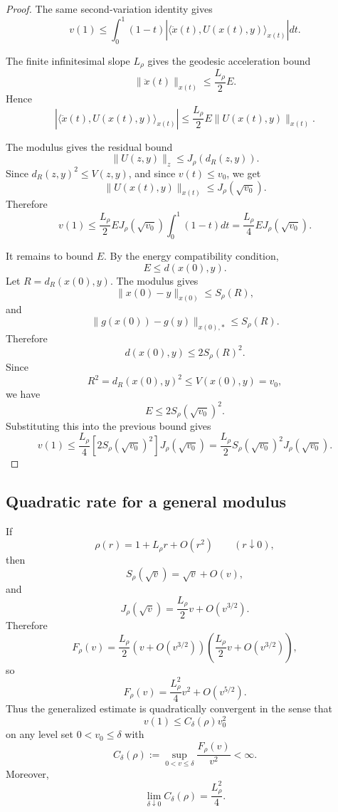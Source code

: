 \documentclass[11pt]{article}
\begin{document}
\begin{proof}
The same second-variation identity gives
\[
    v(1)
    \le
    \int_0^1(1-t)
    \left|
    \langle \ddot x(t),U(x(t),y)\rangle_{x(t)}
    \right|dt.
\]

The finite infinitesimal slope \(L_\rho\) gives the geodesic acceleration bound
\[
    \|\ddot x(t)\|_{x(t)}
    \le
    \frac{L_\rho}{2}E.
\]
Hence
\[
    \left|
    \langle \ddot x(t),U(x(t),y)\rangle_{x(t)}
    \right|
    \le
    \frac{L_\rho}{2}E\|U(x(t),y)\|_{x(t)}.
\]

The modulus gives the residual bound
\[
    \|U(z,y)\|_z
    \le
    J_\rho(d_R(z,y)).
\]
Since \(d_R(z,y)^2\le V(z,y)\), and since \(v(t)\le v_0\), we get
\[
    \|U(x(t),y)\|_{x(t)}
    \le
    J_\rho(\sqrt{v_0}).
\]
Therefore
\[
    v(1)
    \le
    \frac{L_\rho}{2}EJ_\rho(\sqrt{v_0})
    \int_0^1(1-t)dt
    =
    \frac{L_\rho}{4}EJ_\rho(\sqrt{v_0}).
\]

It remains to bound \(E\). By the energy compatibility condition,
\[
    E\le d(x(0),y).
\]
Let \(R=d_R(x(0),y)\). The modulus gives
\[
    \|x(0)-y\|_{x(0)}\le S_\rho(R),
\]
and
\[
    \|g(x(0))-g(y)\|_{x(0),*}\le S_\rho(R).
\]
Therefore
\[
    d(x(0),y)
    \le
    2S_\rho(R)^2.
\]
Since
\[
    R^2=d_R(x(0),y)^2\le V(x(0),y)=v_0,
\]
we have
\[
    E
    \le
    2S_\rho(\sqrt{v_0})^2.
\]
Substituting this into the previous bound gives
\[
    v(1)
    \le
    \frac{L_\rho}{4}
    \left[
        2S_\rho(\sqrt{v_0})^2
    \right]
    J_\rho(\sqrt{v_0})
    =
    \frac{L_\rho}{2}
    S_\rho(\sqrt{v_0})^2
    J_\rho(\sqrt{v_0}).
\]
\end{proof}

\subsection*{Quadratic rate for a general modulus}

If
\[
    \rho(r)=1+L_\rho r+O(r^2)
    \qquad
    (r\downarrow0),
\]
then
\[
    S_\rho(\sqrt v)
    =
    \sqrt v+O(v),
\]
and
\[
    J_\rho(\sqrt v)
    =
    \frac{L_\rho}{2}v+O(v^{3/2}).
\]
Therefore
\[
    F_\rho(v)
    =
    \frac{L_\rho}{2}
    \left(v+O(v^{3/2})\right)
    \left(\frac{L_\rho}{2}v+O(v^{3/2})\right),
\]
so
\[
    F_\rho(v)
    =
    \frac{L_\rho^2}{4}v^2+O(v^{5/2}).
\]
Thus the generalized estimate is quadratically convergent in the sense that
\[
    v(1)\le C_\delta(\rho)v_0^2
\]
on any level set \(0<v_0\le\delta\) with
\[
    C_\delta(\rho)
    :=
    \sup_{0<v\le\delta}
    \frac{F_\rho(v)}{v^2}
    <\infty.
\]
Moreover,
\[
    \lim_{\delta\downarrow0}C_\delta(\rho)
    =
    \frac{L_\rho^2}{4}.
\]
\end{document}
